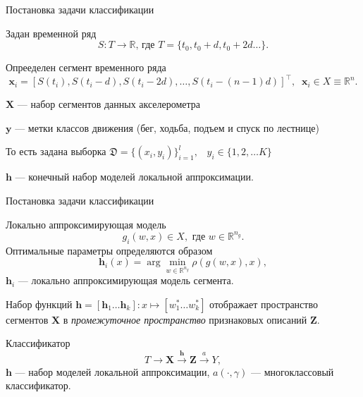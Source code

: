 \documentclass{beamer}
\newcommand{\bx}{\mathbf{x}}
\newcommand{\by}{\mathbf{y}}
\newcommand{\bX}{\mathbf{X}}
\newcommand{\bh}{\mathbf{h}}
\newcommand{\bZ}{\mathbf{Z}}
\newcommand{\brs}[1]{\left(#1\right)}
\newcommand{\R}{\mathbb{R}}
\begin{document}



\begin{frame}{Постановка задачи классификации}
    \begin{block}{Задан временной ряд}
    $$
    S: T \to \R \text{, где } T = \{t_0, t_0 + d, t_0 + 2d \ldots\}.
    $$
    \end{block}
    \begin{block}{Опрееделен сегмент временного ряда}%
    $$
    \bx_i  = [S(t_i), S(t_i - d), S(t_i - 2d), \ldots, S(t_i - (n - 1)d)]^\intercal,
\;\; \bx_i \in X \equiv \R^n.
    $$
    \end{block}
        $\bX$ — набор сегментов данных акселерометра

        $\by$ — метки классов движения (бег, ходьба, подъем и спуск по лестнице)

        То есть задана выборка $\mathfrak{D} = \{ (x_i, y_i) \}_{i=1}^l, \;\;\; y_i \in \{1, 2, \ldots K\}$

        $\bh$ — конечный набор моделей локальной аппроксимации.

\end{frame}



\begin{frame}{Постановка задачи классификации}
    \begin{block}{Локально аппроксимирующая модель}
        $$
        g_i(w, x) \in X, \text{ где }w \in \R^{n_g}.
        $$
        Оптимальные параметры определяются образом
        $$
        \bh_i(x) = \arg\min_{w \in \R^{n_g}} \rho\brs{g(w, x), x},
        $$
        $\bh_i$ — локально аппроксимирующая модель сегмента.
    \end{block}

    Набор функций $\bh = [\bh_1\ldots \bh_k]: x \mapsto [w_1^* \ldots w_k^*]$
    отображает пространство сегментов $\bX$ в
    \textit{промежуточное пространство} признаковых описаний $\bZ$.
    \begin{block}{Классификатор}
        $$
        T \rightarrow \bX \xrightarrow{\bh} \bZ \xrightarrow{a} Y,
        $$
        $\bh$ — набор моделей локальной аппроксимации, $a(\cdot, \gamma)$ —
        многоклассовый классификатор.
    \end{block}
\end{frame}
\end{document}
